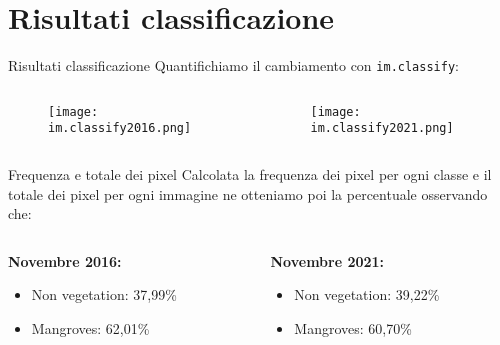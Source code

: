 \documentclass{beamer} %
\begin{document}
\section{Risultati classificazione}
\begin{frame}{Risultati classificazione}
Quantifichiamo il cambiamento con \texttt{im.classify}:
\bigskip
\begin{columns}
\begin{column}{0.5\textwidth}
\begin{figure}
    \centering
    \texttt{[image: im.classify2016.png]}
\end{figure}
\end{column}
\begin{column}{0.5\textwidth}
\begin{figure}
    \centering
    \texttt{[image: im.classify2021.png]}
\end{figure}
\end{column}
\end{columns}
    
\end{frame}
            \begin{frame}{Frequenza e totale dei pixel}
            Calcolata la frequenza dei pixel per ogni classe e il totale dei pixel per ogni immagine
ne otteniamo poi la percentuale osservando che:
\bigskip
\bigskip
\bigskip
\begin{columns}
\begin{column}{0.5\textwidth}
\textbf{Novembre 2016:}
\begin{itemize}
    \item Non vegetation: 37,99\%
    \item Mangroves: 62,01\%
\end{itemize}
\end{column}
\begin{column}{0.5\textwidth}  
\textbf{Novembre 2021:}
 \begin{itemize}
    \item Non vegetation: 39,22\%
    \item Mangroves: 60,70\%
    \end{itemize}

            \end{column}
            \end{columns}
            \end{frame}
\end{document}
